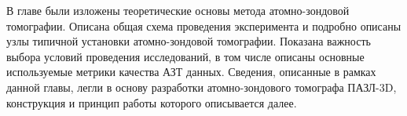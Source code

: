 В главе были изложены теоретические основы метода атомно-зондовой томографии. Описана общая схема проведения эксперимента и подробно описаны узлы типичной установки атомно-зондовой томографии. Показана важность выбора условий проведения исследований, в том числе описаны основные используемые метрики качества АЗТ данных. Сведения, описанные в рамках данной главы, легли в основу разработки атомно-зондового томографа ПАЗЛ-3D, конструкция и принцип работы которого описывается далее.



























